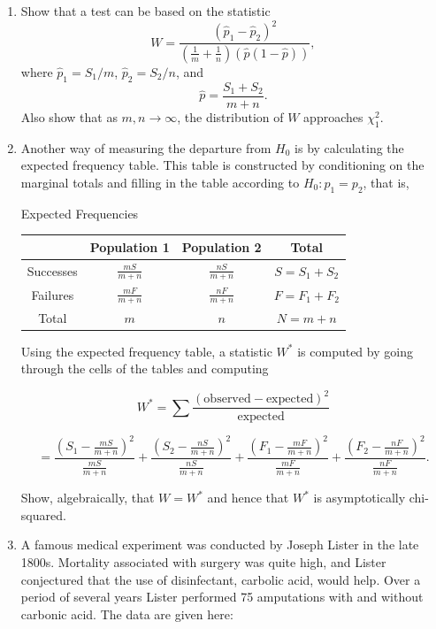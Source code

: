 \documentclass[letterpaper]{article}
\begin{document}
	\begin{enumerate}
		
		\item[i] Show that a test can be based on the statistic
		\[
		W = \frac{(\hat p_1 - \hat p_2)^2}{\left(\frac{1}{m} + \frac{1}{n}\right)\left(\hat p (1-\hat p)\right)},
		\]
		where $\hat p_1 = S_1/m$, $\hat p_2 = S_2/n$, and
		\[
		\hat p = \frac{S_1 + S_2}{m+n}.
		\]
		Also show that as $m,n \to \infty$, the distribution of $W$ approaches $\chi^2_1$.
		
		\item[ii] Another way of measuring the departure from $H_0$ is by calculating the expected frequency table. 
		This table is constructed by conditioning on the marginal totals and filling in the table according to $H_0: p_1=p_2$, that is,
		
		\medskip
		
		\begin{center}
			Expected Frequencies
			
			\begin{tabular}{c|c|c|c}
				& Population 1 & Population 2 & Total \\
				\hline
				Successes & $\frac{mS}{m+n}$ & $\frac{nS}{m+n}$ & $S = S_1 + S_2$ \\
				Failures & $\frac{mF}{m+n}$ & $\frac{nF}{m+n}$ & $F = F_1 + F_2$ \\
				\hline
				Total & $m$ & $n$ & $N = m+n$
			\end{tabular}
		\end{center}
		
		Using the expected frequency table, a statistic $W^*$ is computed by going through the cells of the tables and computing
		
		\[
		W^* =
		\sum \frac{(\text{observed} - \text{expected})^2}{\text{expected}}
		\]
		
		\[
		=
		\frac{\left(S_1 - \frac{mS}{m+n}\right)^2}{\frac{mS}{m+n}}
		+
		\frac{\left(S_2 - \frac{nS}{m+n}\right)^2}{\frac{nS}{m+n}}
		+
		\frac{\left(F_1 - \frac{mF}{m+n}\right)^2}{\frac{mF}{m+n}}
		+
		\frac{\left(F_2 - \frac{nF}{m+n}\right)^2}{\frac{nF}{m+n}}.
		\]
		
		Show, algebraically, that $W = W^*$ and hence that $W^*$ is asymptotically chi-squared.
		
		\item[iii] A famous medical experiment was conducted by Joseph Lister in the late 1800s. 
		Mortality associated with surgery was quite high, and Lister conjectured that the use of disinfectant, carbolic acid, would help. 
		Over a period of several years Lister performed 75 amputations with and without carbonic acid. 
		The data are given here:
		

\end{enumerate}
\end{document}
